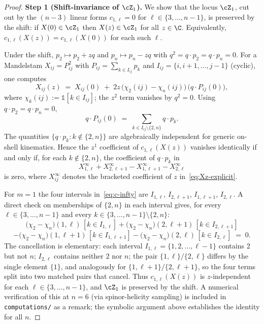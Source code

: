 \begin{proof}
\textbf{Step 1 (Shift-invariance of $\cZ_1$).}
We show that the locus $\cZ_1$, cut out by the $(n-3)$
linear forms $c_{1,\ell} = 0$ for $\ell \in \{3, \ldots, n-1\}$,
is preserved by the shift: if $X(0) \in \cZ_1$ then
$X(z) \in \cZ_1$ for all $z \in \C$. Equivalently,
$c_{1,\ell}(X(z)) = c_{1,\ell}(X(0))$ for each such $\ell$.

Under the shift, $p_2 \mapsto p_2 + zq$ and
$p_n \mapsto p_n - zq$ with $q^2 = q \cdot p_2 = q \cdot p_n = 0$.
For a Mandelstam $X_{ij} = P_{ij}^2$ with
$P_{ij} = \sum_{k \in I_{ij}} p_k$ and
$I_{ij} = \{i, i{+}1, \ldots, j{-}1\}$ (cyclic), one computes
\begin{equation}
  X_{ij}(z) \;=\; X_{ij}(0)
  \;+\; 2z\,\bigl(\chi_2(ij) - \chi_n(ij)\bigr)\,
  \bigl(q \cdot P_{ij}(0)\bigr),
  \label{eq:Xz-explicit}
\end{equation}
where $\chi_k(ij) := \mathbb{1}[k \in I_{ij}]$; the $z^2$ term
vanishes by $q^2 = 0$. Using $q \cdot p_2 = q \cdot p_n = 0$,
\[
  q \cdot P_{ij}(0) \;=\; \sum_{k \in I_{ij} \setminus \{2,n\}}
  q \cdot p_k.
\]
The quantities $\{q \cdot p_k : k \notin \{2, n\}\}$ are
algebraically independent for generic on-shell kinematics.
Hence the $z^1$ coefficient of $c_{1,\ell}(X(z))$ vanishes
identically if and only if, for each $k \notin \{2, n\}$,
the coefficient of $q \cdot p_k$ in
\begin{equation}
  X_{1,\ell}^{\infty} + X_{2,\ell+1}^{\infty}
  - X_{1,\ell+1}^{\infty} - X_{2,\ell}^{\infty}
  \label{eq:c-infty}
\end{equation}
is zero, where $X_{ij}^\infty$ denotes the bracketed
coefficient of $z$ in~\eqref{eq:Xz-explicit}.

For $m = 1$ the four intervals in~\eqref{eq:c-infty} are
$I_{1,\ell}$, $I_{2,\ell+1}$, $I_{1,\ell+1}$, $I_{2,\ell}$.
A direct check on memberships of $\{2, n\}$ in each interval
gives, for every $\ell \in \{3, \ldots, n-1\}$ and every
$k \in \{3, \ldots, n-1\} \setminus \{2, n\}$:
\[
  \bigl(\chi_2 - \chi_n\bigr)(1,\ell)\,[k \in I_{1,\ell}]
  + \bigl(\chi_2 - \chi_n\bigr)(2,\ell+1)\,[k \in I_{2,\ell+1}]
\]\[
  - \bigl(\chi_2 - \chi_n\bigr)(1,\ell+1)\,[k \in I_{1,\ell+1}]
  - \bigl(\chi_2 - \chi_n\bigr)(2,\ell)\,[k \in I_{2,\ell}]
  \;=\; 0.
\]
The cancellation is elementary: each interval
$I_{1,\ell} = \{1, 2, \ldots, \ell-1\}$ contains $2$ but not
$n$; $I_{2,\ell}$ contains neither $2$ nor $n$; the pair
$\{1,\ell\}/\{2,\ell\}$ differs by the single element $\{1\}$,
and analogously for $\{1,\ell+1\}/\{2,\ell+1\}$, so the four
terms split into two matched pairs that cancel.
Thus $c_{1,\ell}(X(z))$ is $z$-independent for each
$\ell \in \{3, \ldots, n-1\}$, and $\cZ_1$ is preserved by
the shift.
A numerical verification of this at $n = 6$ (via spinor-helicity
sampling) is included in \texttt{computations/} as a remark;
the symbolic argument above establishes the identity for all $n$.


\end{proof}
